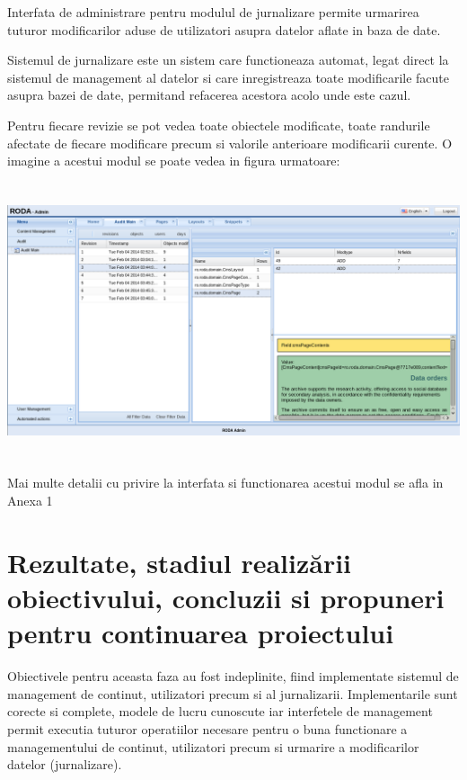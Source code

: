 \documentclass[a4paper, 10pt]{article}
\begin{document}
{Interfata de administrare pentru modulul de jurnalizare permite urmarirea tuturor modificarilor aduse de utilizatori asupra datelor aflate in baza de date. 

\bigskip

Sistemul de jurnalizare este un sistem care functioneaza automat, legat direct la sistemul de management al datelor si care inregistreaza toate modificarile facute asupra bazei de date, permitand refacerea acestora acolo unde este cazul. 



\bigskip

Pentru fiecare revizie se pot vedea toate obiectele modificate, toate randurile afectate de fiecare modificare precum si valorile anterioare modificarii curente. O imagine a acestui modul se poate vedea in figura urmatoare:

\begin{center}
\includegraphics[width=16.1cm,height=8.1cm]{audit.png}
\end{center}


Mai multe detalii cu privire la interfata si functionarea acestui modul se afla in Anexa 1


\bigskip

\medskip

\clearpage

\section{Rezultate, stadiul realiz\u{a}rii obiectivului, concluzii si propuneri pentru continuarea proiectului}


\medskip

Obiectivele pentru aceasta faza au fost indeplinite, fiind implementate sistemul de management de continut, utilizatori precum si al jurnalizarii. 
Implementarile sunt corecte si complete, modele de lucru cunoscute iar interfetele de management permit executia tuturor operatiilor necesare pentru o buna functionare a managementului de continut, utilizatori precum si urmarire a modificarilor datelor (jurnalizare). 

}
\end{document}

